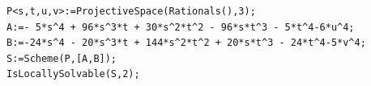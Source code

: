 \documentclass[a4paper,12pt,english,reqno]{amsart}
\begin{document}
\begin{lstlisting}
P<s,t,u,v>:=ProjectiveSpace(Rationals(),3);
A:=- 5*s^4 + 96*s^3*t + 30*s^2*t^2 - 96*s*t^3 - 5*t^4-6*u^4;
B:=-24*s^4 - 20*s^3*t + 144*s^2*t^2 + 20*s*t^3 - 24*t^4-5*v^4;
S:=Scheme(P,[A,B]);
IsLocallySolvable(S,2);
\end{lstlisting}

%
%
%
%
\end{document}
